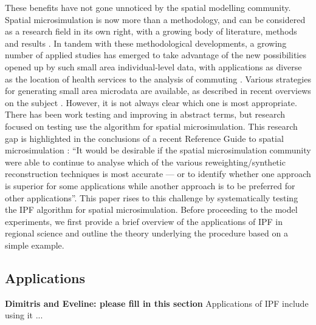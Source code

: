 \documentclass[a4paper,10pt]{article}
\begin{document}

These benefits have not gone unnoticed by the spatial modelling community.
Spatial microsimulation is now more than a methodology, and
can be considered as a research field in its
own right, with a growing body of literature, methods and results \citep{Tanton2013}.
In tandem with these methodological developments, a growing number of applied studies
has emerged to take advantage of the new possibilities opened up by such small area individual-level data,
with applications as diverse as the location of health services \citep{Tomintz2008} to the
analysis of commuting \citep{Lovelace2014-jtg}.
Various strategies for generating small area microdata are available,
as described in recent overviews on the subject \citep{Tanton2013, Ballas2013-4policy-analysis, Hermes2012a}.
However, it is not always clear which one is most appropriate.
There has been work testing \citep{Jirousek1995} and improving \citep{teh2003improving} 
in abstract terms, but research focused on testing use the algorithm for spatial microsimulation.
This research gap is highlighted in the conclusions of a recent Reference Guide to spatial microsimulation
\citep[p~270]{Clarke2013-concs}:
``It would be desirable if the spatial microsimulation community were able to continue to
analyse which of the various reweighting/synthetic reconstruction techniques is most accurate
--- or to identify whether one approach is superior for some applications while another
approach is to be preferred for other applications''.
This paper rises to this challenge by systematically testing the IPF algorithm for spatial microsimulation.
Before proceeding to the model experiments, we first
provide a brief overview of the applications of IPF in regional science
and outline the theory underlying the procedure based on a simple example. 

\subsection{Applications}
\textbf{Dimitris and Eveline: please fill in this section}
Applications of IPF include using it ...
\end{document}
